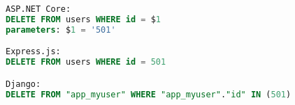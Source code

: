 \begin{lstlisting}[language=SQL,caption={\acrshort{sql} commands for deleting objects},breaklines=true,label={lst:sqlDelete}]
ASP.NET Core:
DELETE FROM users WHERE id = $1
parameters: $1 = '501'

Express.js:
DELETE FROM users WHERE id = 501

Django:
DELETE FROM "app_myuser" WHERE "app_myuser"."id" IN (501)
\end{lstlisting}
